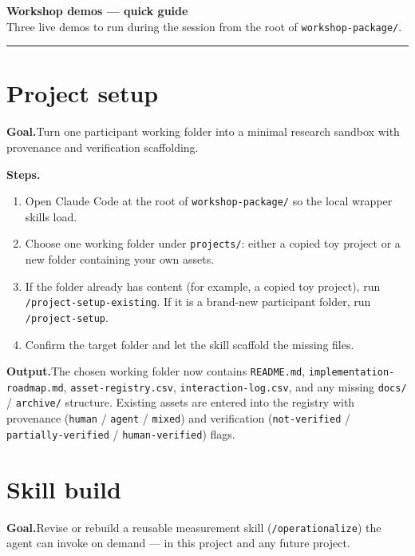 \documentclass[10pt,a4paper]{article}
\begin{document}
\begin{center}
{\Large\bfseries\color{wgpdark} Workshop demos --- quick guide}\\[0.2em]
{\small\color{wgpgray} Three live demos to run during the session from the root of \texttt{workshop-package/}.}
\end{center}

\vspace{0.3em}
\noindent\textcolor{wgpblue}{\rule{\linewidth}{0.6pt}}

\section{Project setup}
\textbf{Goal.}\quad Turn one participant working folder into a minimal research sandbox with provenance and verification scaffolding.

\smallskip
\textbf{Steps.}
\begin{enumerate}
  \item Open Claude Code at the root of \texttt{workshop-package/} so the local wrapper skills load.
  \item Choose one working folder under \texttt{projects/}: either a copied toy project or a new folder containing your own assets.
  \item If the folder already has content (for example, a copied toy project), run \texttt{/project-setup-existing}. If it is a brand-new participant folder, run \texttt{/project-setup}.
  \item Confirm the target folder and let the skill scaffold the missing files.
\end{enumerate}

\smallskip
\textbf{Output.}\quad The chosen working folder now contains \texttt{README.md}, \texttt{implementation-roadmap.md}, \texttt{asset-registry.csv}, \texttt{interaction-log.csv}, and any missing \texttt{docs/} / \texttt{archive/} structure. Existing assets are entered into the registry with provenance (\texttt{human} / \texttt{agent} / \texttt{mixed}) and verification (\texttt{not-verified} / \texttt{partially-verified} / \texttt{human-verified}) flags.

\section{Skill build}
\textbf{Goal.}\quad Revise or rebuild a reusable measurement skill (\texttt{/operationalize}) the agent can invoke on demand --- in this project and any future project.
\end{document}

